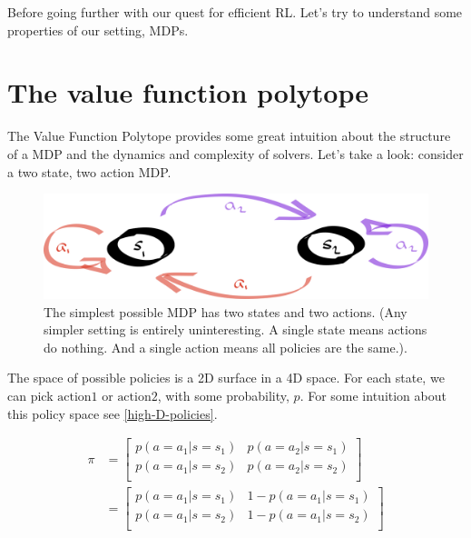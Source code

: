 
\newpage

Before going further with our quest for efficient RL. Let's try to understand
some properties of our setting, MDPs.


\section{The value function polytope}

The Value Function Polytope \cite{Dadashi2018} provides some great intuition
about the structure of a MDP and the dynamics and complexity of solvers.
Let's take a look: consider a two state, two action MDP.

\begin{figure}[hb!]
\centering
\includegraphics[width=1\textwidth,height=0.25\textheight]{../../pictures/drawings/2-state-automata.png}
\caption{The simplest possible MDP has two states and two actions. (Any simpler setting is entirely uninteresting. A single state means actions do nothing.
And a single action means all policies are the same.).}
\end{figure}

The space of possible policies is a 2D surface in a 4D space. For each state, we
can pick $\text{action1}$ or $\text{action2}$, with some probability, $p$. For some intuition
about this policy space see \ref{high-D-policies}.

\begin{align}
\pi &=
\begin{bmatrix}
  p(a=a_1|s=s_1) & p(a=a_2|s=s_1) \\
  p(a=a_1|s=s_2) & p(a=a_2|s=s_2)\\
\end{bmatrix} \\
&=
\begin{bmatrix}
p(a=a_1|s=s_1) & 1-p(a=a_1|s=s_1) \\
p(a=a_1|s=s_2) & 1-p(a=a_1|s=s_2)\\
\end{bmatrix}
\end{align}

